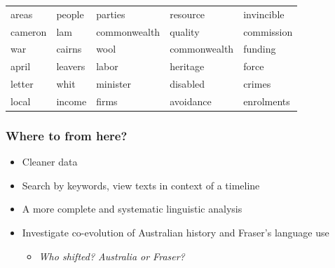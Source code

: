 \documentclass{beamer}       %
\begin{document}
\begin{frame}
\begin{table}[h!]
\begin{tabular}{lllll}
areas        & people     & \cellcolor{gray!25}parties      & resource     & invincible  \\
cameron      & \cellcolor{gray!25}lam        & commonwealth & quality      & commission  \\
\cellcolor{green!25}war          & cairns     & \cellcolor{red!25}wool         & commonwealth & \cellcolor{orange!25}funding     \\
april        & leavers    & \cellcolor{gray!25}labor        & heritage     & \cellcolor{green!25}force       \\
letter       & \cellcolor{gray!25}whit       & \cellcolor{gray!25}minister     & \cellcolor{yellow!25}disabled     & crimes      \\
\cellcolor{red!25}local        & \cellcolor{orange!25}income     & firms        & avoidance    & enrolments  \\
\bottomrule
\end{tabular}
\end{table}
\end{frame}


\begin{frame}
	\frametitle{Where to from here?}
	
	\begin{itemize}
	\item Cleaner data
	\item Search by keywords, view texts in context of a timeline
	\item A more complete and systematic linguistic analysis
	\item Investigate co-evolution of Australian history and Fraser's language use
	\begin{itemize}
	\item \emph{Who shifted? Australia or Fraser?}
	\end{itemize}
	\end{itemize}
\end{frame}
\end{document}
